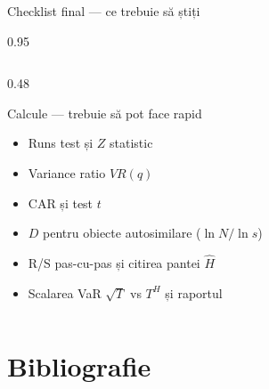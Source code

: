 \documentclass[9pt, aspectratio=169, t]{beamer}
\begin{document}
\begin{frame}[shrink=25]{Checklist final --- ce trebuie să știți}
\begin{cminipage}{0.95\textwidth}
\begin{columns}[T]
\begin{column}{0.48\textwidth}
\begin{block}{Calcule --- trebuie să pot face rapid}
\begin{itemize}
    \item[$\square$] Runs test și $Z$ statistic
    \item[$\square$] Variance ratio $VR(q)$
    \item[$\square$] CAR și test $t$
    \item[$\square$] $D$ pentru obiecte autosimilare ($\ln N / \ln s$)
    \item[$\square$] R/S pas-cu-pas și citirea pantei $\hat H$
    \item[$\square$] Scalarea VaR $\sqrt T$ vs $T^H$ și raportul
\end{itemize}
\end{block}
\end{column}
\end{columns}

\end{cminipage}
\end{frame}

\section{Bibliografie}
\end{document}
